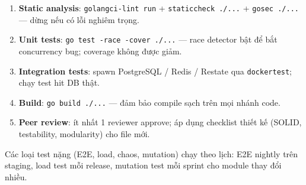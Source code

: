 \begin{enumerate}
    \item \textbf{Static analysis}: \texttt{golangci-lint run} + \texttt{staticcheck ./...} + \texttt{gosec ./...} --- dừng nếu có lỗi nghiêm trọng.
    \item \textbf{Unit tests}: \texttt{go test -race -cover ./...} --- race detector bật để bắt concurrency bug; coverage không được giảm.
    \item \textbf{Integration tests}: spawn PostgreSQL / Redis / Restate qua \texttt{dockertest}; chạy test hit DB thật.
    \item \textbf{Build}: \texttt{go build ./...} --- đảm bảo compile sạch trên mọi nhánh code.
    \item \textbf{Peer review}: ít nhất 1 reviewer approve; áp dụng checklist thiết kế (SOLID, testability, modularity) cho file mới.
\end{enumerate}

Các loại test nặng (E2E, load, chaos, mutation) chạy theo lịch: E2E nightly trên staging, load test mỗi release, mutation test mỗi sprint cho module thay đổi nhiều.

